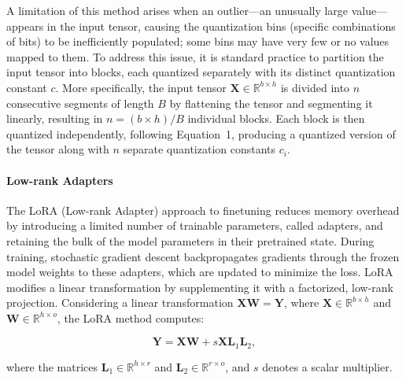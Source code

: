 A limitation of this method arises when an outlier—an unusually large value—appears in the input tensor, causing the quantization bins (specific combinations of bits) to be inefficiently populated; some bins may have very few or no values mapped to them. To address this issue, it is standard practice to partition the input tensor into blocks, each quantized separately with its distinct quantization constant $c$. More specifically, the input tensor $\mathbf{X}\in \mathbb{R}^{b\times h}$ is divided into $n$ consecutive segments of length $B$ by flattening the tensor and segmenting it linearly, resulting in ${n = ({b\times h} )/{B} }$ individual blocks. Each block is then quantized independently, following Equation~1, producing a quantized version of the tensor along with $n$ separate quantization constants $c_i$.

\paragraph{Low-rank Adapters} The LoRA (Low-rank Adapter) approach to finetuning \citep{hu2021lora} reduces memory overhead by introducing a limited number of trainable parameters, called adapters, and retaining the bulk of the model parameters in their pretrained state. During training, stochastic gradient descent backpropagates gradients through the frozen model weights to these adapters, which are updated to minimize the loss. LoRA modifies a linear transformation by supplementing it with a factorized, low-rank projection. Considering a linear transformation ${\mathbf{X} \mathbf{W} = \mathbf{Y}}$, where $\mathbf{X}\in  \mathbb{R}^{b\times h}$ and $\mathbf{W}\in  \mathbb{R}^{h\times o}$, the LoRA method computes:

\begin{equation}
    \mathbf{Y} = \mathbf{X}\mathbf{W} + s\mathbf{X}\mathbf{L}_1\mathbf{L}_2,
\end{equation}

where the matrices $\mathbf{L}_1\in  \mathbb{R}^{h\times r}$ and $\mathbf{L}_2\in  \mathbb{R}^{r\times o}$, and $s$ denotes a scalar multiplier.

